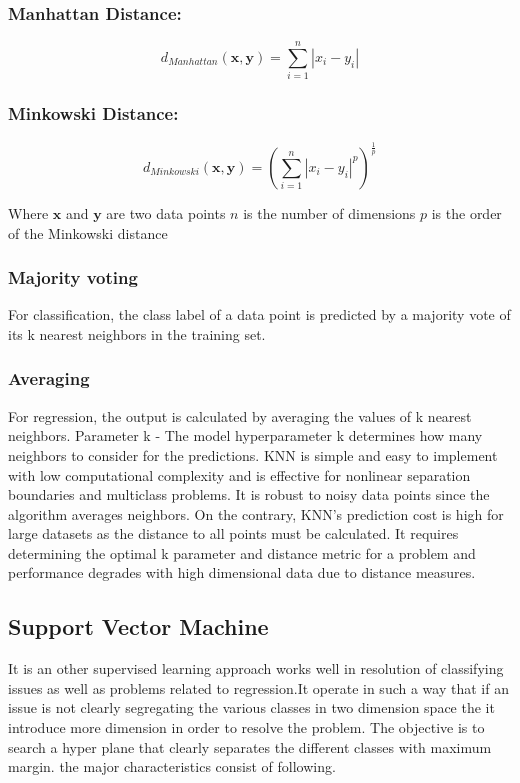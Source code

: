 \documentclass[12pt, a4paper, twoside]{report}
\theoremstyle{plain} %
\theoremstyle{definition} %
\theoremstyle{remark} %
\numberwithin{equation}{chapter}
\begin{document}
\subsubsection{Manhattan Distance:}

\begin{equation}
\label{eq:Manhattan}
d_{Manhattan}(\mathbf{x}, \mathbf{y}) = \sum_{i=1}^{n}|x_i - y_i|
\end{equation}

\subsubsection{Minkowski Distance:}

\begin{equation}
\label{eq:Minkowski}
d_{Minkowski}(\mathbf{x}, \mathbf{y}) = \left(\sum_{i=1}^{n}|x_i - y_i|^{p}\right)^{\frac{1}{p}}
\end{equation}

Where $\mathbf{x}$ and $\mathbf{y}$ are two data points
$n$ is the number of dimensions
$p$ is the order of the Minkowski distance

\subsubsection{Majority voting} For classification, the class label of a data point is predicted by a majority vote of its k nearest neighbors in the training set.
\subsubsection{Averaging} For regression, the output is calculated by averaging the values of k nearest neighbors.
Parameter k - The model hyperparameter k determines how many neighbors to consider for the predictions. KNN is simple and easy to implement with low computational complexity and is effective for nonlinear separation boundaries and multiclass problems. It is robust to noisy data points since the algorithm averages neighbors. On the contrary, KNN's prediction cost is high for large datasets as the distance to all points must be calculated. It requires determining the optimal k parameter and distance metric for a problem
and performance degrades with high dimensional data due to distance measures.

\subsection{Support Vector Machine}
It is an other supervised learning approach works well in resolution of classifying issues as well as  problems related to regression.It operate in such a way that if an issue is not clearly segregating the various classes in two dimension space the it introduce more dimension in order to resolve the problem.  The objective is to search a hyper plane that clearly separates the different classes with maximum margin. the major characteristics consist of following.
\end{document}

